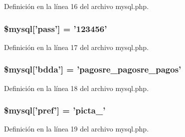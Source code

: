 Definición en la línea 16 del archivo mysql.\-php.

\hypertarget{mysql_8php_a29834c14ccc128006f5f4ff30417762a}{
\subsubsection[{\$mysql}]{\setlength{\rightskip}{0pt plus 5cm}\${\bf mysql}\mbox{[}'pass'\mbox{]} = '123456'}}\label{mysql_8php_a29834c14ccc128006f5f4ff30417762a}


Definición en la línea 17 del archivo mysql.\-php.

\hypertarget{mysql_8php_ad8cf4b12c73eaf96b253c794a223a506}{
\subsubsection[{\$mysql}]{\setlength{\rightskip}{0pt plus 5cm}\${\bf mysql}\mbox{[}'bdda'\mbox{]} = 'pagosre\-\_\-pagosre\-\_\-pagos'}}\label{mysql_8php_ad8cf4b12c73eaf96b253c794a223a506}


Definición en la línea 18 del archivo mysql.\-php.

\hypertarget{mysql_8php_a289b7ce8a1af0f5281112b43967b5e67}{
\subsubsection[{\$mysql}]{\setlength{\rightskip}{0pt plus 5cm}\${\bf mysql}\mbox{[}'pref'\mbox{]} = 'picta\-\_\-'}}\label{mysql_8php_a289b7ce8a1af0f5281112b43967b5e67}


Definición en la línea 19 del archivo mysql.\-php.

